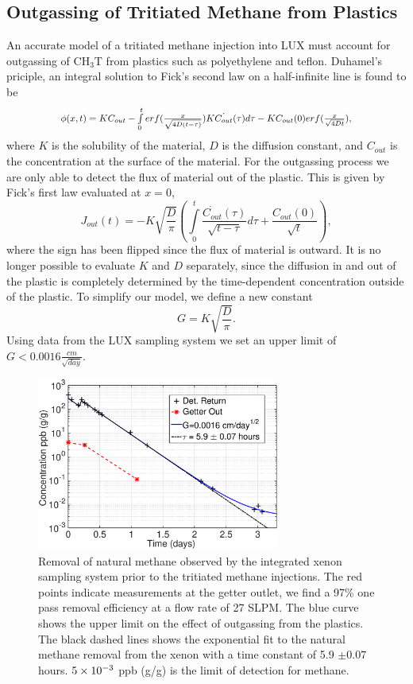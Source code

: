 \subsection{Outgassing of Tritiated Methane from Plastics}

\newcommand*{\Scale}[2][4]{\scalebox{#1}{$#2$}}%

An accurate model of a tritiated methane injection into LUX must account for outgassing of CH$_3$T from plastics such as polyethylene and teflon. Duhamel's priciple, an integral solution to Fick's second law on a half-infinite line is found to be
\[\Scale[0.85]{\phi (x,t) = KC_{out} - \int \limits_0^t erf(\frac{x}{\sqrt{4D(t - \tau)}})K\dot{C_{out}}(\tau)d\tau - KC_{out}(0)erf(\frac{x}{\sqrt{4Dt}}),}\]
where $K$ is the solubility of the material, $D$ is the diffusion constant, and $C_{out}$ is the concentration at the surface of the material. 
For the outgassing process we are only able to detect the flux of material out of the plastic.  This is given by Fick's first law evaluated at $x=0$,
\[J_{out}(t)= - K \sqrt{\frac{D}{\pi}}\left( \int \limits_0^t \frac{\dot{C_{out}}(\tau)}{\sqrt{t-\tau}} d \tau + \frac{C_{out}(0)}{\sqrt{t}}\right),\]
where the sign has been flipped since the flux of material is outward.  It is no longer possible to evaluate $K$ and $D$ separately, since the diffusion in and out of the plastic is completely determined by the time-dependent concentration outside of the plastic.  To simplify our model, we define a new constant
\[ G = K \sqrt{ \frac{D}{ \pi }} .\] Using data from the LUX sampling system we set an upper limit of $G<0.0016 \frac{cm}{\sqrt{day}}$. 

\begin{figure}[h!]\centering
\includegraphics[width=80mm]{fig/July_CH4_wOG.eps}
\caption{Removal of natural methane observed by the integrated xenon sampling system prior to the tritiated methane injections. The red points indicate measurements at the getter outlet, we find a 97\% one pass removal efficiency at a flow rate of 27 SLPM. The blue curve shows the upper limit on the effect of outgassing from the plastics. The black dashed lines shows the exponential fit to the natural methane removal from the xenon with a time constant of 5.9 $\pm 0.07$ hours. $\rm 5\times10^{-3}$ ppb (g/g) is the limit of detection for methane.}
\label{fig:ch4_removal}
\end{figure}


